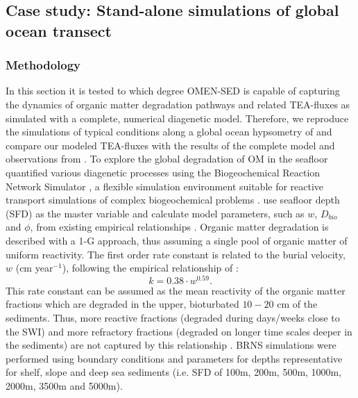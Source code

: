 \documentclass[gmd, manuscript]{copernicus}
\begin{document}
\subsection{Case study: Stand-alone simulations of global ocean transect}\label{subsec:globalhypsometry}
\subsubsection{Methodology}
In this section it is tested to which degree OMEN-SED is capable of capturing the dynamics of organic matter degradation pathways and related TEA-fluxes as simulated with a complete, numerical diagenetic model. 
Therefore, we reproduce the simulations of typical conditions along a global ocean hypsometry of \citet{thullner_global_scale_2009} and compare our modeled TEA-fluxes with the results of the complete model and observations 
from \citet{middelburg_denitrification_1996}. To explore the global degradation of OM in the seafloor 
\citet{thullner_global_scale_2009} quantified various diagenetic processes using the Biogeochemical Reaction Network Simulator \citep[BRNS,][]{aguilera_knowledge-based_2005}, 
a flexible simulation environment suitable for reactive transport simulations of complex biogeochemical problems \citep[e.g.][]{jourabchi_quantitative_2005, thullner_modeling_2005}. 
\citet{thullner_global_scale_2009} use seafloor depth (SFD) as the master variable and calculate model parameters, such as $w$, $D_{bio}$ and $\phi$, from existing empirical relationships 
\citep[e.g.][]{van1995metal, middelburg_empirical_1997}. 
Organic matter degradation is described with a 1-G approach, thus assuming a single pool of organic matter of uniform reactivity. 
The first order rate constant is related to the burial velocity, $w$ (cm year$^{-1}$), following the empirical relationship of \citet{boudreau1997diagenetic}:
\begin{equation}
 k=0.38\cdot w^{0.59}.
\end{equation}
This rate constant can be assumed as the mean reactivity of the organic matter fractions which are degraded in the upper, bioturbated $10-20$ cm of the sediments. 
Thus, more reactive fractions (degraded during days/weeks close to the SWI) and more refractory fractions (degraded on longer time scales deeper in the sediments) are not captured by this relationship \citep{boudreau1997diagenetic}. 
BRNS simulations were performed using boundary conditions and parameters for depths representative for shelf, slope and deep sea sediments (i.e. SFD of 100m, 200m, 500m, 1000m, 2000m, 3500m and 5000m). 
\end{document}
